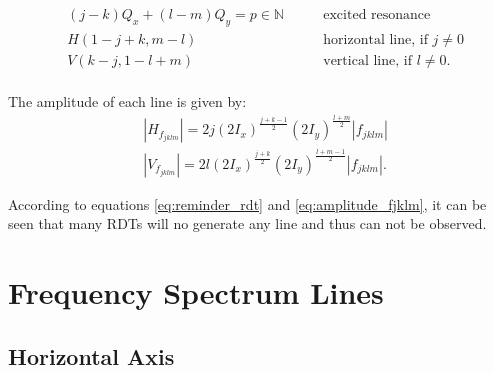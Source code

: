 \begin{equation}\begin{aligned}
& (j-k)Q_x + (l-m)Q_y = p \in \mathbb{N} \quad\quad& \mbox{excited resonance}\\
& H(1 - j + k, m - l) \quad\quad& \mbox{horizontal line, if } j \ne 0 \\
& V(k - j, 1 - l + m) \quad\quad& \mbox{vertical line, if } l \ne 0. \\
\end{aligned}
\label{eq:reminder_rdt}
\end{equation}

The amplitude of each line is given by:
\begin{equation}
    \begin{aligned}
    &|H_{f_{jklm}}| = 2 j (2 I_x)^\frac{j+k-1}{2} (2 I_y)^\frac{l+m}{2} |f_{jklm}| \\
    &|V_{f_{jklm}}| = 2 l (2 I_x)^\frac{j+k}{2} (2 I_y)^\frac{l+m-1}{2} |f_{jklm}|.
    \label{eq:amplitude_fjklm}
    \end{aligned}
\end{equation}

According to equations \ref{eq:reminder_rdt} and \ref{eq:amplitude_fjklm}, it can be seen that many RDTs will no generate any line and thus can not be observed.

\section{Frequency Spectrum Lines}

\subsection{Horizontal Axis}

